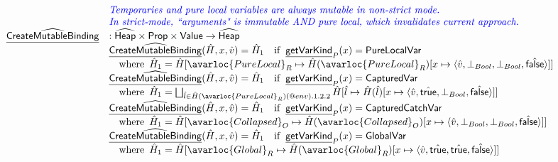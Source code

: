 \[\begin{array}{ll}
& {\inblue \textit{Temporaries and pure local variables are always mutable in non-strict mode.}} \\
& {\inblue \textit{In strict-mode, ``arguments" is immutable AND pure local, which invalidates current approach.}} \\
\ahf{CreateMutableBinding} & : \aHeap \times \SF{Prop} \times \SF{Value} \rightarrow \aHeap \\
& \ahf{CreateMutableBinding}(\hat{H}, x, \hat{v}) = \hat{H}_1 \quad\ifc{\chf{getVarKind}_P(x) = \SF{PureLocalVar}} \\
& \quad\wherec{\hat{H}_1 = \hat{H}[\avarloc{PureLocal}_R \mapsto \hat{H}(\avarloc{PureLocal}_R)
    [x \mapsto \langle \hat{v},\bot_{Bool},\bot_{Bool},\afalse \rangle]]} \\
& \ahf{CreateMutableBinding}(\hat{H}, x, \hat{v}) = \hat{H}_1 \quad\ifc{\chf{getVarKind}_P(x) = \SF{CapturedVar}} \\
& \quad\wherec{\hat{H}_1 = \bigsqcup_{\hat{l}\in\hat{H}(\avarloc{PureLocal}_R)(\varprop{env}).1.2.2} \hat{H}[\hat{l} \mapsto \hat{H}(\hat{l})
    [x \mapsto \langle \hat{v},\atrue,\bot_{Bool},\afalse \rangle]]} \\
& \ahf{CreateMutableBinding}(\hat{H}, x, \hat{v}) = \hat{H}_1 \quad\ifc{\chf{getVarKind}_P(x) = \SF{CapturedCatchVar}} \\
& \quad\wherec{\hat{H}_1 = \hat{H}[\avarloc{Collapsed}_O \mapsto \hat{H}(\avarloc{Collapsed}_O)
    [x \mapsto \langle \hat{v},\bot_{Bool},\bot_{Bool},\afalse \rangle]]} \\
& \ahf{CreateMutableBinding}(\hat{H}, x, \hat{v}) = \hat{H}_1 \quad\ifc{\chf{getVarKind}_P(x) = \SF{GlobalVar}} \\
& \quad\wherec{\hat{H}_1 = \hat{H}[\avarloc{Global}_R \mapsto \hat{H}(\avarloc{Global}_R)
    [x \mapsto \langle \hat{v},\atrue,\atrue,\afalse \rangle]]} \\
\\
\end{array}
\]
\\

